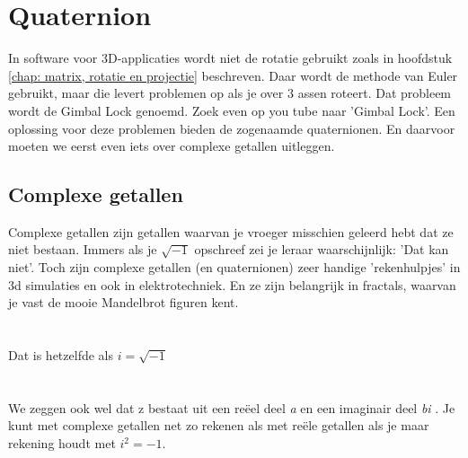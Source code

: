 \chapter{Quaternion}
\label{chap: Quaternion}
In software voor 3D-applicaties wordt niet de rotatie gebruikt zoals in hoofdstuk \ref{chap: matrix, rotatie en projectie} beschreven. Daar wordt de methode van Euler gebruikt, maar die levert problemen op als je over 3 assen roteert. Dat probleem wordt de Gimbal Lock genoemd. Zoek even op you tube naar 'Gimbal Lock'. 
Een oplossing voor deze problemen bieden de zogenaamde quaternionen. En daarvoor moeten we eerst even iets over complexe getallen uitleggen.
\section{Complexe getallen}
Complexe getallen zijn getallen waarvan je vroeger misschien geleerd hebt dat ze niet bestaan. Immers als je $ \sqrt{-1} $ opschreef zei je leraar waarschijnlijk: 'Dat kan niet'. Toch zijn complexe getallen (en quaternionen) zeer handige 'rekenhulpjes' in 3d simulaties en ook in elektrotechniek. En ze zijn belangrijk in fractals, waarvan je vast de mooie Mandelbrot figuren kent. \\ \\
\\
Dat is hetzelfde als $ i =\sqrt{-1} $ \\ \\
\\
We zeggen ook wel dat z bestaat uit een reëel deel \textit{a} en een imaginair deel \textit{bi} .  Je kunt met complexe getallen net zo rekenen als met reële getallen als je maar rekening houdt met $  i^2 = -1.$
